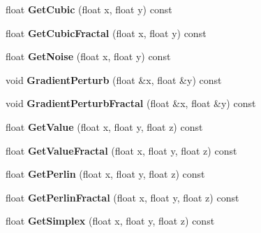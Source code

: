 \begin{DoxyCompactItemize}
float {\bfseries Get\+Cubic} (float x, float y) const
\item 
\mbox{\label{class_flounder_1_1_noise_fast_aa0504bae2713464aa8d3399c977fb3d5}} 
float {\bfseries Get\+Cubic\+Fractal} (float x, float y) const
\item 
\mbox{\label{class_flounder_1_1_noise_fast_a49b92163b603f5fb02449b916a74d964}} 
float {\bfseries Get\+Noise} (float x, float y) const
\item 
\mbox{\label{class_flounder_1_1_noise_fast_abfade72d396bbf69ec3dfdbf6cc64998}} 
void {\bfseries Gradient\+Perturb} (float \&x, float \&y) const
\item 
\mbox{\label{class_flounder_1_1_noise_fast_ab247021351e5a97d30c9e6f397aaaa46}} 
void {\bfseries Gradient\+Perturb\+Fractal} (float \&x, float \&y) const
\item 
\mbox{\label{class_flounder_1_1_noise_fast_a7c147b666adc5208ac730ba32669cf52}} 
float {\bfseries Get\+Value} (float x, float y, float z) const
\item 
\mbox{\label{class_flounder_1_1_noise_fast_aad974e2c57ed3e52087a175b594acfbd}} 
float {\bfseries Get\+Value\+Fractal} (float x, float y, float z) const
\item 
\mbox{\label{class_flounder_1_1_noise_fast_a64d95154d12d005544a56268fc51a94f}} 
float {\bfseries Get\+Perlin} (float x, float y, float z) const
\item 
\mbox{\label{class_flounder_1_1_noise_fast_a1c89b1b826142ee5d0eaaf2f73f0df5d}} 
float {\bfseries Get\+Perlin\+Fractal} (float x, float y, float z) const
\item 
\mbox{\label{class_flounder_1_1_noise_fast_a5134b9b3a358ce9812ae1b8e47a65ad6}} 
float {\bfseries Get\+Simplex} (float x, float y, float z) const
\item 
\mbox{\label{class_flounder_1_1_noise_fast_a55e42b24ba3cf277dd5f6f112d4a26da}} 

\end{DoxyCompactItemize}
